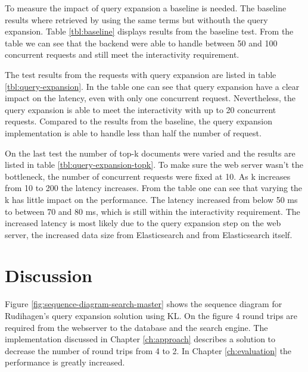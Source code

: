 To measure the impact of query expansion a baseline is needed.
The baseline results where retrieved by using the same terms but withouth the query expansion.
Table \ref{tbl:baseline} displays results from the baseline test.
From the table we can see that the backend were able to handle between 50 and 100 concurrent requests and still meet the interactivity requirement.

The test results from the requests with query expansion are listed in table \ref{tbl:query-expansion}.
In the table one can see that query expansion have a clear impact on the latency, even with only one concurrent request.
Nevertheless, the query expansion is able to meet the interactivity with up to 20 concurrent requests.
Compared to the results from the baseline,
the query expansion implementation is able to handle less than half the number of request.

On the last test the number of top-k documents were varied and the results are listed in table \ref{tbl:query-expansion-topk}.
To make sure the web server wasn't the bottleneck, the number of concurrent requests were fixed at 10.
As k increases from 10 to 200 the latency increases.
From the table one can see that varying the k has little impact on the performance.
The latency increased from below 50 ms to between 70 and 80 ms, which is still within the interactivity requirement.
The increased latency is most likely due to the query expansion step on the web server,
the increased data size from Elasticsearch and from Elasticsearch itself.



\section{Discussion}
Figure \ref{fig:sequence-diagram-search-master} shows the sequence diagram for Rudihagen's query expansion solution using KL.
On the figure 4 round trips are required from the webserver to the database and the search engine.
The implementation discussed in Chapter \ref{ch:approach} describes a solution to decrease the number of round trips from 4 to 2.
In Chapter \ref{ch:evaluation} the performance is greatly increased.

